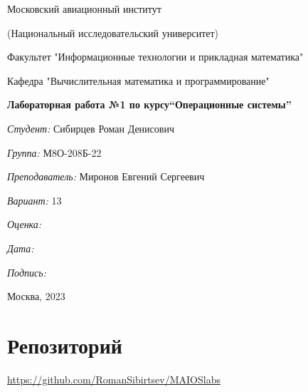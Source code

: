\documentclass[a4paper, 12pt]{article}
\begin{document}
\thispagestyle{empty}	
\begin{center}
	Московский авиационный институт
	
	(Национальный исследовательский университет)
	
	Факультет "Информационные технологии и прикладная математика"
	
	Кафедра "Вычислительная математика и программирование"
	
\end{center}
\vspace{40ex}
\begin{center}
	\textbf{\large{Лабораторная работа №1 по курсу\linebreak \textquotedblleft Операционные системы\textquotedblright}}
\end{center}
\vspace{35ex}
\begin{flushright}
	\textit{Студент: } Сибирцев Роман Денисович
	
	\vspace{2ex}
	\textit{Группа: } М8О-208Б-22
	
	\vspace{2ex}
	\textit{Преподаватель: } Миронов Евгений Сергеевич
	
	\vspace{2ex}
	\textit{Вариант: } 13
	
	\vspace{2ex}
	\textit{Оценка: } \underline{\quad\quad\quad\quad\quad\quad}
	
	 \vspace{2ex}
	\textit{Дата: } \underline{\quad\quad\quad\quad\quad\quad}
	
	\vspace{2ex}
	\textit{Подпись: } \underline{\quad\quad\quad\quad\quad\quad}
	
\end{flushright}

\vspace{5ex}

\begin{vfill}
	\begin{center}
		Москва, 2023
	\end{center}	
\end{vfill}
\newpage


\begingroup
\color{black}
\tableofcontents\newpage
\endgroup

\section{Репозиторий}
\href{https://github.com/RomanSibirtsev/MAI_OS_labs}{https://github.com/RomanSibirtsev/MAIOSlabs}
\end{document}
